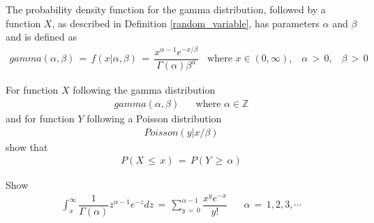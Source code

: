 \begin{definition}
The probability density function for the gamma distribution, followed by a function $X$, as described in Definition \ref{random_variable}, has parameters $\alpha$ and $\beta$ and is defined as 
\begin{align*}
    gamma(\alpha, \beta) \hspace{2pt} = \hspace{2pt} f(x | \alpha, \beta) \hspace{2pt} = \hspace{2pt} \dfrac{x^{\alpha - 1} e^{-x/\beta}}{\Gamma(\alpha)\beta^{\alpha}} \hspace{10pt} \text{where} \hspace{4pt} x \in (0, \infty), \hspace{10pt} \alpha \hspace{2pt} > \hspace{2pt} 0, \hspace{10pt} \beta \hspace{2pt} > \hspace{2pt} 0
\end{align*}
\end{definition}

\begin{exercise}
For function $X$ following the gamma distribution 
\begin{align*}
    gamma(\alpha, \beta) \hspace{20pt} \text{where} \hspace{4pt} \alpha \in \mathbb{Z}
\end{align*}
and for function $Y$ following a Poisson distribution
\begin{align*}
    Poisson(y | x/\beta)
\end{align*}
show that
\begin{align*}
    P(X \hspace{2pt} \leq \hspace{2pt} x) \hspace{2pt} = \hspace{2pt} P(Y \hspace{2pt} \geq \hspace{2pt} \alpha)
\end{align*}
\end{exercise}

\begin{exercise}
Show
\begin{align*}
    \int_{x}^{\infty} \dfrac{1}{\Gamma(\alpha)} z^{\alpha - 1} e^{-z} dz \hspace{2pt} = \hspace{2pt} \sum_{y \hspace{2pt} = \hspace{2pt} 0}^{\alpha - 1} \dfrac{x^{y} e^{-x}}{y!} \hspace{20pt} \alpha \hspace{2pt} = \hspace{2pt} 1, 2, 3, \cdots
\end{align*}
\end{exercise}